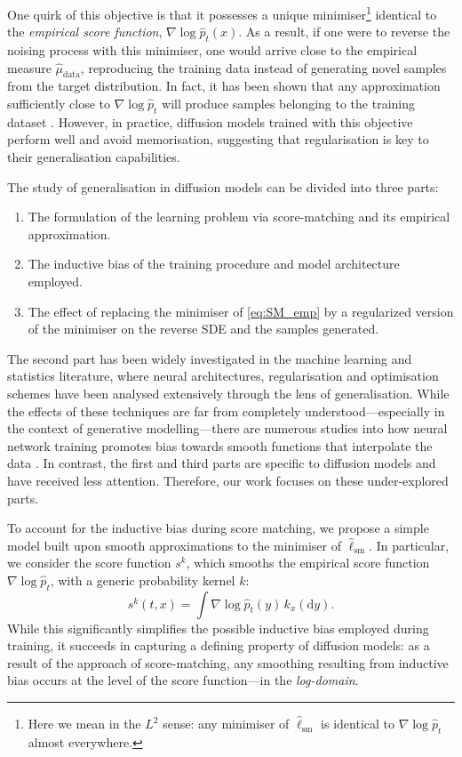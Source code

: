 \documentclass[10pt]{article}
\newcommand{\mathd}{\mathrm{d}}
\theoremstyle{plain}
\theoremstyle{definition}
\theoremstyle{remark}
\newcommand{\sm}{{\operatorname{sm}}}
\begin{document}
One quirk of this objective is that it possesses a unique minimiser\footnote{Here we mean in the \(L^2\) sense: any minimiser of \(\hat{\ell}_\sm\) is identical to \(\nabla \log \hat{p}_t\) almost everywhere.} identical to the \emph{empirical score function}, $\nabla \log \hat{p}_t(x)$. As a result, if one were to reverse the noising process with this minimiser, one would arrive close to the empirical measure $\hat{\mu}_{\text{data}}$, reproducing the training data instead of generating novel samples from the target distribution. In fact, it has been shown that any approximation sufficiently close to \(\nabla \log \hat{p}_t\) will produce samples belonging to the training dataset \citep{pidstrigach2022scorebased}. However, in practice, diffusion models trained with this objective perform well and avoid memorisation, suggesting that regularisation is key to their generalisation capabilities.



The study of generalisation in diffusion models can be divided into three parts:
\begin{enumerate}
    \item The formulation of the learning problem via score-matching and its empirical approximation.
    \item The inductive bias of the training procedure and model architecture employed.
    \item The effect of replacing the minimiser of \eqref{eq:SM_emp} by a regularized version of the minimiser on the reverse SDE and the samples generated.
\end{enumerate}
The second part has been widely investigated in the machine learning and statistics literature, where neural architectures, regularisation and optimisation schemes have been analysed extensively through the lens of generalisation. While the effects of these techniques are far from completely understood---especially in the context of generative modelling---there are numerous studies into how neural network training promotes bias towards smooth functions that interpolate the data \citep{rahaman_spectral_bias, mulayoff2021implicit, ma2021linear, vardi2023implicit}. In contrast, the first and third parts are specific to diffusion models and have received less attention. Therefore, our work focuses on these under-explored parts.

To account for the inductive bias during score matching, we propose a simple model built upon smooth approximations to the minimiser of \(\hat{\ell}_\sm\). In particular, we consider the score function \(s^k\), which smooths the empirical score function $\nabla \log \hat{p}_t$, with a generic probability kernel \(k\):
\begin{equation}
    s^k(t, x) = \int \nabla \log \hat{p}_t(y) \, k_x(\mathd y).
    \label{eq:kernel_smoothed_score}
\end{equation}
While this significantly simplifies the possible inductive bias employed during training, it succeeds in capturing a defining property of diffusion models: as a result of the approach of score-matching, any smoothing resulting from inductive bias occurs at the level of the score function—in the \emph{log-domain}.
\end{document}

